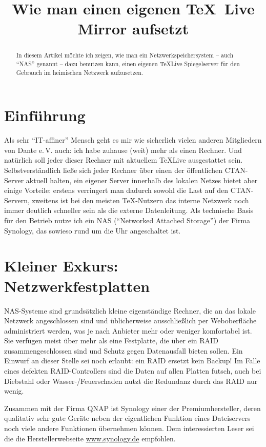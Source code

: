 \documentclass{dtk}
\title{Wie man einen eigenen \TeX~Live Mirror aufsetzt}
\begin{document}
\maketitle

\begin{abstract}
In diesem Artikel möchte ich zeigen, wie man ein Netzwerkspeichersystem -- auch \enquote{NAS} genannt -- dazu benutzen kann, einen eigenen \TeX Live Spiegelserver für den Gebrauch im heimischen Netzwerk aufzusetzen.
\end{abstract}

\section{Einführung}

Als sehr \enquote{IT-affiner} Mensch geht es mir wie sicherlich vielen anderen Mitgliedern von Dante e.\,V. auch: ich habe zuhause (weit) mehr als einen Rechner. Und natürlich soll jeder dieser Rechner mit aktuellem \TeX Live ausgestattet sein. Selbstverständlich ließe sich jeder Rechner über einen der öffentlichen CTAN-Server aktuell halten, ein eigener Server innerhalb des lokalen Netzes bietet aber einige Vorteile: erstens verringert man dadurch sowohl die Last auf den CTAN-Servern, zweitens ist bei den meisten \TeX-Nutzern das interne Netzwerk noch immer deutlich schneller sein als die externe Datenleitung. Als technische Basis für den Betrieb nutze ich ein NAS (\enquote{Networked Attached Storage}) der Firma Synology, das sowieso rund um die Uhr angeschaltet ist.

\section{Kleiner Exkurs: Netzwerkfestplatten}

NAS-Systeme sind grundsätzlich kleine eigenständige Rechner, die an das lokale Netzwerk angeschlossen sind und üblicherweise ausschließlich per Weboberfläche administriert werden, was je nach Anbieter mehr oder weniger komfortabel ist. Sie verfügen meist über mehr als eine Festplatte, die über ein RAID zusammengeschlossen sind und Schutz gegen Datenausfall bieten sollen. Ein Einwurf an dieser Stelle sei noch erlaubt: ein RAID ersetzt kein Backup! Im Falle eines defekten RAID-Controllers sind die Daten auf allen Platten futsch, auch bei Diebstahl oder Wasser-/Feuerschaden nutzt die Redundanz durch das RAID nur wenig.

Zusammen mit der Firma QNAP ist Synology einer der Premiumhersteller, deren qualitativ sehr gute Geräte neben der eigentlichen Funktion eines Dateiservers noch viele andere Funktionen übernehmen können. 
Dem interessierten Leser sei die die Herstellerwebseite \url{www.synology.de} empfohlen. 
\end{document}
